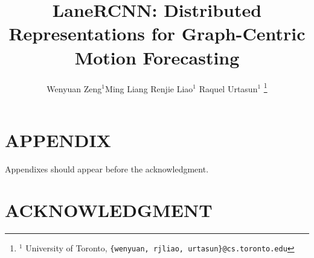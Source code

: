 \documentclass[letterpaper, 10 pt, conference]{ieeeconf}  %
\title{\LARGE \bf
LaneRCNN: Distributed Representations for Graph-Centric Motion Forecasting
}
\author{
  Wenyuan Zeng$^{1}$\quad Ming Liang \quad Renjie Liao$^{1}$ \quad
  Raquel Urtasun$^{1}$%
  \thanks{$^1$ University of Toronto, \small\texttt{\{wenyuan, rjliao,
  urtasun\}@cs.toronto.edu}}
}
\begin{document}
\maketitle
\thispagestyle{empty}
\pagestyle{empty}


\begin{abstract}

\end{abstract}









% 


\section*{APPENDIX}

Appendixes should appear before the acknowledgment.

\section*{ACKNOWLEDGMENT}









\end{document}
